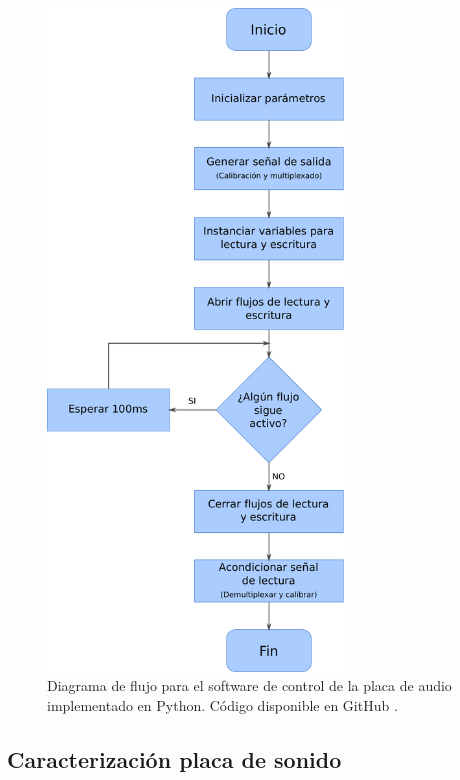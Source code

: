 \documentclass[a4paper,11pt]{article}
\begin{document}
    \begin{figure}[!h] 
        \centering
        \includegraphics[width=0.7\textwidth]{imagenes/flowchart.pdf}
        \caption{Diagrama de flujo para el software de control de la placa de audio implementado en Python. Código disponible en GitHub \cite{repo}.}
        \label{fig:flowchart}
 
    \end{figure}
    \clearpage
	
	\subsection{Caracterización placa de sonido}
	\label{sec:caracterizacion}
\end{document}
